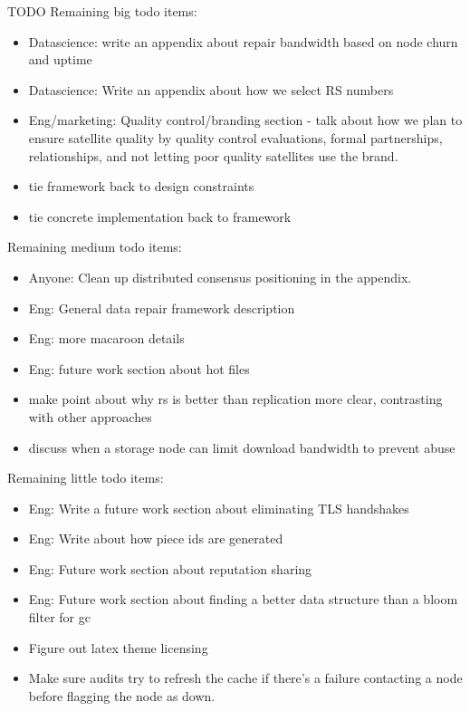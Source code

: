 \documentclass[11pt,fleqn,openany]{book}
\newcommand{\todo}[1]{{\color{red} TODO #1 }}
\begin{document}
\todo{
Remaining big todo items:
\begin{itemize}
\item Datascience: write an appendix about repair bandwidth based on node
  churn and uptime
\item Datascience: Write an appendix about how we select RS numbers
\item Eng/marketing: Quality control/branding section - talk about how we
  plan to ensure satellite quality by quality control evaluations, formal
  partnerships, relationships, and not letting poor quality satellites
  use the brand.
\item tie framework back to design constraints
\item tie concrete implementation back to framework
\end{itemize}

Remaining medium todo items:
\begin{itemize}
\item Anyone:
  Clean up distributed consensus positioning in the appendix.
\item Eng: General data repair framework description
\item Eng: more macaroon details
\item Eng: future work section about hot files
\item make point about why rs is better than replication more clear,
  contrasting with other approaches
\item discuss when a storage node can limit download bandwidth to prevent
  abuse
\end{itemize}

Remaining little todo items:
\begin{itemize}
\item Eng: Write a future work section about eliminating TLS handshakes
\item Eng: Write about how piece ids are generated
\item Eng: Future work section about reputation sharing
\item Eng: Future work section about finding a better data structure than
 a bloom filter for gc
\item Figure out latex theme licensing
\item Make sure audits try to refresh the cache if there's a failure contacting
  a node before flagging the node as down.
\end{itemize}
}

\newpage
\end{document}
